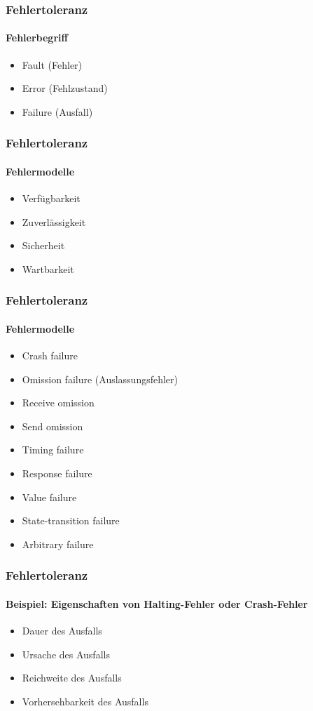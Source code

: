 \begin{frame}
  \frametitle{Fehlertoleranz}
  \framesubtitle{Fehlerbegriff}
 \begin{itemize}
    \item Fault (Fehler)
    \item Error (Fehlzustand)
    \item Failure (Ausfall)
  \end{itemize}    
\end{frame}

\begin{frame}
  \frametitle{Fehlertoleranz}
  \framesubtitle{Fehlermodelle}
 \begin{itemize}
    \item Verfügbarkeit
    \item Zuverlässigkeit
    \item Sicherheit
    \item Wartbarkeit
  \end{itemize}    
\end{frame}

\begin{frame}
  \frametitle{Fehlertoleranz}
  \framesubtitle{Fehlermodelle}
 \begin{itemize}
    \item Crash failure
    \item Omission failure (Auslassungsfehler)
    \item Receive omission
    \item Send omission
    \item Timing failure
    \item Response failure
    \item Value failure
    \item State-transition failure
    \item Arbitrary failure
  \end{itemize}    
\end{frame}

\begin{frame}
  \frametitle{Fehlertoleranz}
  \framesubtitle{Beispiel: Eigenschaften von Halting-Fehler oder Crash-Fehler}
 \begin{itemize}
    \item Dauer des Ausfalls
    \item Ursache des Ausfalls
    \item Reichweite des Ausfalls
    \item Vorhersehbarkeit des Ausfalls
  \end{itemize}    
\end{frame}

